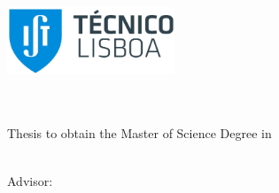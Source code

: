 
\begin{titlepage}
\includegraphics[width=5cm]{images/Logo_IST_color}~\\[2.0cm]
\begin{center}
{\LARGE \textbf{\Title}}\\[1.0cm]
{\Large \textbf{\StudentName}}\\[1.0cm]
{\large Thesis to obtain the Master of Science Degree in}\\[1.0cm]
{\LARGE \textbf{\DegreeName}}\\[1.0cm]

\begin{minipage}[t]{.75\textwidth}
\begin{center}
{\large Advisor:\:}
{\Supervisors}
\end{center}
\end{minipage}\\[1.0cm]


\end{center}
\end{titlepage}
